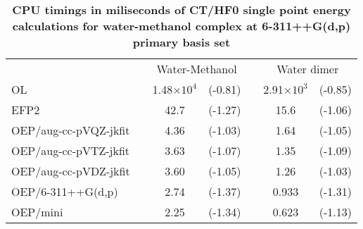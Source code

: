 \documentclass[aip,jcp,amsmath,amssymb,reprint,floatfix]{revtex4-1}
\begin{document}
{
\renewcommand{\arraystretch}{1.4}
\begin{table}[h]
\caption[Minimal auxiliary basis set optimized for OEP\hyp{}based CT/HF0 calculations.]
{{\bf CPU timings in miliseconds of CT/HF0 single point energy calculations
for water-methanol complex at 6-311++G(d,p) primary basis set\footnotemark[1]}
}
\label{t:5}
\begin{ruledtabular}
\begin{tabular}{llccccc}
                      && \multicolumn{2}{c}{Water-Methanol} && \multicolumn{2}{c}{Water dimer} \\
\cline{3-4}
\cline{6-7}
OL                    &&1.48$\times 10^{4}$ 
                                &(-0.81)&& 2.91$\times 10^{3}$     
                                                    &(-0.85) \\  %
EFP2                  &&  42.7  &(-1.27)&&   15.6   &(-1.06) \\
OEP/aug-cc-pVQZ-jkfit &&   4.36 &(-1.03)&&    1.64  &(-1.05) \\
OEP/aug-cc-pVTZ-jkfit &&   3.63 &(-1.07)&&    1.35  &(-1.09) \\
OEP/aug-cc-pVDZ-jkfit &&   3.60 &(-1.05)&&    1.26  &(-1.03) \\
OEP/6-311++G(d,p)     &&   2.74 &(-1.37)&&    0.933 &(-1.31) \\
OEP/mini\footnotemark[2]&& 2.25 &(-1.34)&&    0.623 &(-1.13) \\
\end{tabular}
\end{ruledtabular}
%
%
\end{table}
}
%
\end{document}
